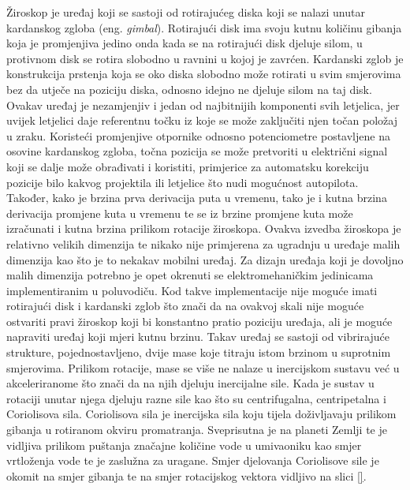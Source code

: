 \documentclass[times, utf8, diplomski]{fer}
\begin{document}
Žiroskop je uređaj koji se sastoji od rotirajućeg diska koji se nalazi unutar kardanskog zgloba (eng. \textit{gimbal}). Rotirajući
disk ima svoju kutnu količinu gibanja koja je promjenjiva jedino onda kada se na rotirajući disk djeluje silom, u protivnom
disk se rotira slobodno u ravnini u kojoj je zavrćen. Kardanski zglob je konstrukcija prstenja koja se oko diska
slobodno može rotirati u svim smjerovima bez da utječe na poziciju diska, odnosno idejno ne djeluje silom na taj disk. Ovakav uređaj
je nezamjenjiv i jedan od najbitnijih komponenti svih letjelica, jer uvijek letjelici daje referentnu točku iz koje se može
zaključiti njen točan položaj u zraku. Koristeći promjenjive otpornike odnosno potenciometre postavljene na osovine kardanskog zgloba,
točna pozicija se može pretvoriti u električni signal koji se dalje može obrađivati i koristiti, primjerice za
automatsku korekciju pozicije bilo kakvog projektila ili letjelice što nudi mogućnost autopilota. Također, kako je brzina prva
derivacija puta u vremenu, tako je i kutna brzina derivacija promjene kuta u vremenu te se iz brzine promjene kuta može izračunati
i kutna brzina prilikom rotacije žiroskopa. Ovakva izvedba žiroskopa je
relativno velikih dimenzija te nikako nije primjerena za ugradnju u uređaje malih dimenzija kao što je to nekakav mobilni uređaj.
Za dizajn uređaja koji je dovoljno malih dimenzija potrebno je opet okrenuti se elektromehaničkim jedinicama implementiranim u poluvodiču.
Kod takve implementacije nije moguće imati rotirajući disk i kardanski zglob što znači da na ovakvoj skali nije moguće ostvariti 
pravi žiroskop koji bi konstantno pratio poziciju uređaja, ali je moguće napraviti uređaj koji mjeri kutnu brzinu.
Takav uređaj se sastoji od vibrirajuće strukture, pojednostavljeno, dvije mase koje titraju istom brzinom u suprotnim smjerovima.
Prilikom rotacije, mase se više ne nalaze u inercijskom sustavu već u akceleriranome što znači da na njih djeluju inercijalne sile.
Kada je sustav u rotaciji unutar njega djeluju razne sile kao što su centrifugalna, centripetalna i Coriolisova sila.
Coriolisova sila je inercijska sila koju tijela doživljavaju prilikom gibanja u rotiranom okviru promatranja. Sveprisutna je na 
planeti Zemlji te je vidljiva prilikom puštanja značajne količine vode u umivaoniku kao smjer vrtloženja vode te je zaslužna za
uragane. Smjer djelovanja Coriolisove sile je okomit na smjer gibanja te na smjer rotacijskog vektora vidljivo na slici \ref{}.

\end{document}
